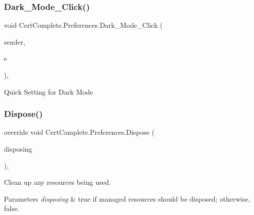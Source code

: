\subsubsection{\texorpdfstring{Dark\+\_\+\+Mode\+\_\+\+Click()}{Dark\_Mode\_Click()}}
{\footnotesize\ttfamily void Cert\+Complete.\+Preferences.\+Dark\+\_\+\+Mode\+\_\+\+Click (\begin{DoxyParamCaption}\item[{object}]{sender,  }\item[{Event\+Args}]{e }\end{DoxyParamCaption})\hspace{0.3cm}{\ttfamily [inline]}, {\ttfamily [private]}}



Quick Setting for Dark Mode 

\mbox{\label{class_cert_complete_1_1_preferences_a847c9ae1a1666bbdb1beb4b93f1471e7}} 
\subsubsection{\texorpdfstring{Dispose()}{Dispose()}}
{\footnotesize\ttfamily override void Cert\+Complete.\+Preferences.\+Dispose (\begin{DoxyParamCaption}\item[{bool}]{disposing }\end{DoxyParamCaption})\hspace{0.3cm}{\ttfamily [inline]}, {\ttfamily [protected]}}



Clean up any resources being used. 


\begin{DoxyParams}{Parameters}
{\em disposing} & true if managed resources should be disposed; otherwise, false.\\
\hline
\end{DoxyParams}
\mbox{\label{class_cert_complete_1_1_preferences_a7fef9667c42378361d486d06d0ea3407}} 

